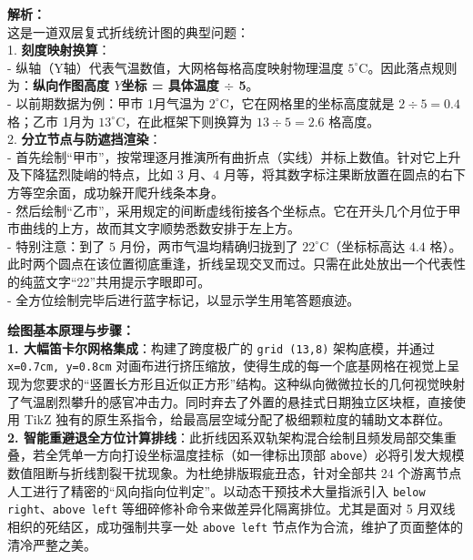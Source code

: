 \vspace{0.8cm}

{\small\color{gray}
\textbf{解析：}\\
这是一道双层复式折线统计图的典型问题：\\
1. \textbf{刻度映射换算}：\\
- 纵轴（Y轴）代表气温数值，大网格每格高度映射物理温度 $5^\circ$C。因此落点规则为：\textbf{纵向作图高度 $Y$坐标 = 具体温度 $\div$ 5}。\\
- 以前期数据为例：甲市 1月气温为 $2^\circ$C，它在网格里的坐标高度就是 $2 \div 5 = 0.4$ 格；乙市 1月为 $13^\circ$C，在此框架下则换算为 $13 \div 5 = 2.6$ 格高度。\\
2. \textbf{分立节点与防遮挡渲染}：\\
- 首先绘制“甲市”，按常理逐月推演所有曲折点（实线）并标上数值。针对它上升及下降猛烈陡峭的特点，比如 $3$ 月、$4$ 月等，将其数字标注果断放置在圆点的右下方等空余面，成功躲开爬升线条本身。\\
- 然后绘制“乙市”，采用规定的间断虚线衔接各个坐标点。它在开头几个月位于甲市曲线的上方，故而其文字顺势悉数安排于左上方。\\
- 特别注意：到了 $5$ 月份，两市气温均精确归拢到了 $22^\circ$C（坐标标高达 $4.4$ 格）。此时两个圆点在该位置彻底重逢，折线呈现交叉而过。只需在此处放出一个代表性的纯蓝文字“22”共用提示字眼即可。\\
- 全方位绘制完毕后进行蓝字标记，以显示学生用笔答题痕迹。
}

\vspace{0.6cm}

{\small\color{blue!70!black}
\textbf{绘图基本原理与步骤：}\\
\textbf{1. 大幅笛卡尔网格集成}：构建了跨度极广的 \texttt{grid (13,8)} 架构底模，并通过 \texttt{x=0.7cm, y=0.8cm} 对画布进行挤压缩放，使得生成的每一个底基网格在视觉上呈现为您要求的“竖置长方形且近似正方形”结构。这种纵向微微拉长的几何视觉映射了气温剧烈攀升的感官冲击力。同时弃去了外置的悬挂式日期独立区块框，直接使用 TikZ 独有的原生系指令，给最高层空域分配了极细颗粒度的辅助文本群位。\\
\textbf{2. 智能重避退全方位计算排线}：此折线因系双轨架构混合绘制且频发局部交集重叠，若全凭单一方向打设坐标温度挂标（如一律标出顶部 \texttt{above}）必将引发大规模数值阻断与折线割裂干扰现象。为杜绝排版瑕疵丑态，针对全部共 24 个游离节点人工进行了精密的“风向指向位判定”。以动态干预技术大量指派引入 \texttt{below right}、\texttt{above left} 等细碎修补命令来做差异化隔离排位。尤其是面对 5 月双线相织的死结区，成功强制共享一处 \texttt{above left} 节点作为合流，维护了页面整体的清冷严整之美。
}

\newpage
